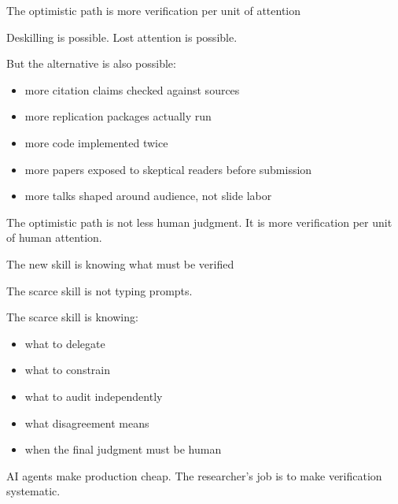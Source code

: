 \documentclass[aspectratio=169,11pt]{beamer}
\begin{document}
\begin{frame}{The optimistic path is more verification per unit of attention}

Deskilling is possible. Lost attention is possible.

\vspace{0.35cm}

But the alternative is also possible:

\begin{itemize}\setlength\itemsep{0.35em}
    \item more citation claims checked against sources
    \item more replication packages actually run
    \item more code implemented twice
    \item more papers exposed to skeptical readers before submission
    \item more talks shaped around audience, not slide labor
\end{itemize}

\vspace{0.35cm}

\alert{The optimistic path is not less human judgment. It is more verification per unit of human attention.}

\end{frame}

\begin{frame}{The new skill is knowing what must be verified}

The scarce skill is not typing prompts.

\vspace{0.35cm}

The scarce skill is knowing:

\begin{itemize}\setlength\itemsep{0.35em}
    \item what to delegate
    \item what to constrain
    \item what to audit independently
    \item what disagreement means
    \item when the final judgment must be human
\end{itemize}

\vspace{0.45cm}

\begin{center}
\alert{AI agents make production cheap. The researcher's job is to make verification systematic.}
\end{center}

\end{frame}
\end{document}

